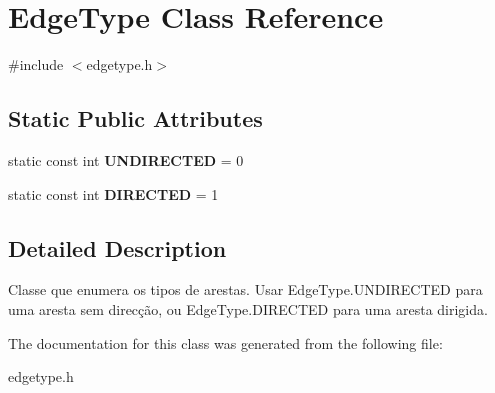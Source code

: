 \hypertarget{class_edge_type}{\section{Edge\-Type Class Reference}
\label{class_edge_type}
}


{\ttfamily \#include $<$edgetype.\-h$>$}

\subsection*{Static Public Attributes}
\begin{DoxyCompactItemize}
\item 
\hypertarget{class_edge_type_a6533cc56d05c288a550b9980b66c9317}{static const int {\bfseries U\-N\-D\-I\-R\-E\-C\-T\-E\-D} = 0}\label{class_edge_type_a6533cc56d05c288a550b9980b66c9317}

\item 
\hypertarget{class_edge_type_a903017a534f2818c2d17145e4ae0321c}{static const int {\bfseries D\-I\-R\-E\-C\-T\-E\-D} = 1}\label{class_edge_type_a903017a534f2818c2d17145e4ae0321c}

\end{DoxyCompactItemize}


\subsection{Detailed Description}
Classe que enumera os tipos de arestas. Usar Edge\-Type.\-U\-N\-D\-I\-R\-E\-C\-T\-E\-D para uma aresta sem direcção, ou Edge\-Type.\-D\-I\-R\-E\-C\-T\-E\-D para uma aresta dirigida. 

The documentation for this class was generated from the following file\-:\begin{DoxyCompactItemize}
\item 
edgetype.\-h\end{DoxyCompactItemize}
